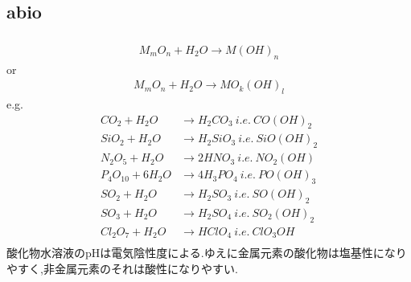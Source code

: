 \documentclass[dvipdfmx,uplatex]{jsarticle}
\begin{document}
\subsection{abio}

%

\subsubsection{}
\begin{align*}
M_mO_n + H_2O \to M(OH)_n
\end{align*}
or \\
\begin{align*}
M_mO_n + H_2O \to MO_k(OH)_l
\end{align*}
e.g. 
\begin{align*}
CO_2 + H_2O	&\to 	H_2CO_3 \ i.e. \ {CO(OH)_2} \\
SiO_2 + H_2O	&\to	H_2SiO_3 \ i.e. \ {SiO(OH)_2} \\
N_2O_5 + H_2O	&\to	2HNO_3\ i.e. \ {NO_2(OH)} \\
P_4O_{10} + 6H_2O	&\to	4H_3PO_4\ i.e. \ {PO(OH)_3} \\
SO_2 + H_2O	&\to	H_2SO_3\ i.e. \ SO(OH)_2 \\
SO_3 + H_2O	&\to	H_2SO_4\ i.e. \ SO_2(OH)_2 \\
Cl_2O_7	+ H_2O	&\to	HClO_4\ i.e. \ {ClO_3OH} \\
\end{align*}
酸化物水溶液のpHは電気陰性度による.ゆえに金属元素の酸化物は塩基性になりやすく,非金属元素のそれは酸性になりやすい.
\end{document}
